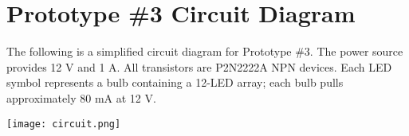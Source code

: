 \chapter{Prototype \#3 Circuit Diagram}

\clearpage

The following is a simplified circuit diagram for Prototype \#3. The power source provides 12 V and 1 A. All transistors are P2N2222A NPN devices. Each LED symbol represents a bulb containing a 12-LED array; each bulb pulls approximately 80 mA at 12 V.

\vspace{1cm}

\centering
\texttt{[image: circuit.png]}